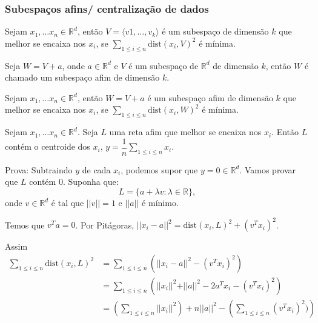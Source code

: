 \subsubsection{Subespa\c{c}os afins/ centraliza\c{c}\~ao de dados}
\begin{definicao}
Sejam $x_1,\dots x_n \in \mathbb{R}^d$, ent\~ao $V = \langle v1,\dots,v_k\rangle$ \'e um subespa\c{c}o de dimens\~ao $k$ que melhor se encaixa nos $x_i$, se $\displaystyle\sum _{1 \le i \le n} \text{dist}(x_i,V)^2$ \'e m\'inima.
\end{definicao}

\begin{definicao}
Seja $W = V + a$, onde $a\in \mathbb{R}^d$ e $V$ \'e um subespa\c{c}o de $\mathbb{R}^d$ de dimens\~ao $k$, ent\~ao $W$ \'e chamado um subespa\c{c}o afim de dimens\~ao $k$.
\end{definicao}

\begin{definicao}
Sejam $x_1,\dots x_n \in \mathbb{R}^d$, ent\~ao $W = V+a $ \'e um subespa\c{c}o afim de dimens\~ao $k$ que melhor se encaixa nos $x_i$, se $\displaystyle\sum _{1 \le i \le n} \text{dist}(x_i,W)^2$ \'e m\'inima.
\end{definicao}

\begin{proposicao} 
Sejam $x_1,\dots x_n \in \mathbb{R}^d$. Seja $L$ uma reta afim que melhor se encaixa nos $x_i$. Ent\~ao $L$ cont\'em o centroide dos $x_i$, $y = \dfrac{1}{n} \displaystyle\sum_{1\le i\le n} x_i$.
\end{proposicao}
Prova: Subtraindo $y$ de cada $x_i$, podemos supor que $y=0\in \mathbb{R}^d$. Vamos provar que $L$ cont\'em $0$. Suponha que:
\[L = \{ a + \lambda v: \lambda \in \mathbb{R}\},\]
onde $v \in \mathbb{R}^d$ \'e tal que $\vert\vert v \vert \vert = 1$ e $\vert\vert a \vert \vert$ \'e m\'inimo.

Temos que $v^Ta=0$. Por Pit\'agoras, $\vert\vert x_i - a \vert \vert ^2 = \text{dist} (x_i,L)^2 + (v^Tx_i)^2$.

Assim
\begin{align*}
\sum _{1\le i \le n} \text{dist}(x_i,L)^2&=\sum _{1\le i \le n} \left(\vert\vert x_i - a \vert \vert ^2 - (v^Tx_i)^2\right)\\
										 &=\sum_{1\le i \le n} \left(\vert\vert x_i\vert \vert ^2 + \vert\vert a\vert \vert^2 - 2a^Tx_i - (v^Tx_i)^2\right)\\ 
										 &= \left(\sum _{1\le i \le n} \vert\vert x_i\vert \vert ^2 \right)+ n \vert\vert a \vert \vert ^2 - \left(\sum _{1\le i \le n}(v^Tx_i)^2)\right)
\end{align*}


